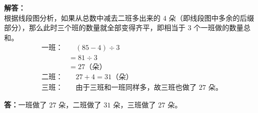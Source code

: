 \vspace{0.6cm}

\textbf{解答：}\\
根据线段图分析，如果从总数中减去二班多出来的 $4$ 朵（即线段图中多余的后缀部分），那么此时三个班的数量就全部变得齐平，即相当于 $3$ 个一班做的数量总和。
\begin{align*}
一班：& \quad (85 - 4) \div 3 \\
      & = 81 \div 3 \\
      & = 27\text{（朵）} \\[6pt]
二班：& \quad 27 + 4 = 31\text{（朵）} \\[6pt]
三班：& \quad \text{由于三班和一班同样多，故三班也做了 } 27\text{ 朵。}
\end{align*}

\noindent\textbf{答：}一班做了 $27$ 朵，二班做了 $31$ 朵，三班做了 $27$ 朵。

\newpage



